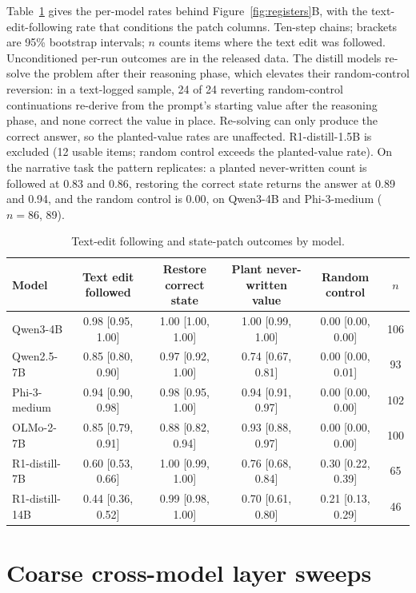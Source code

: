 \documentclass{article}
\begin{document}
Table~\ref{tab:mechanism} gives the per-model rates behind Figure~\ref{fig:registers}B, with the text-edit-following rate that conditions the patch columns. Ten-step chains; brackets are 95\% bootstrap intervals; $n$ counts items where the text edit was followed. Unconditioned per-run outcomes are in the released data. The distill models re-solve the problem after their reasoning phase, which elevates their random-control reversion: in a text-logged sample, 24 of 24 reverting random-control continuations re-derive from the prompt's starting value after the reasoning phase, and none correct the value in place. Re-solving can only produce the correct answer, so the planted-value rates are unaffected. R1-distill-1.5B is excluded (12 usable items; random control exceeds the planted-value rate). On the narrative task the pattern replicates: a planted never-written count is followed at 0.83 and 0.86, restoring the correct state returns the answer at 0.89 and 0.94, and the random control is 0.00, on Qwen3-4B and Phi-3-medium ($n=86$, 89).
\begin{table}[h]
\centering
\caption{Text-edit following and state-patch outcomes by model.}
\label{tab:mechanism}
\scriptsize
\begin{tabular}{lccccc}
\toprule
Model & Text edit followed & Restore correct state & Plant never-written value & Random control & $n$ \\
\midrule
Qwen3-4B & 0.98 [0.95, 1.00] & 1.00 [1.00, 1.00] & 1.00 [0.99, 1.00] & 0.00 [0.00, 0.00] & 106 \\
Qwen2.5-7B & 0.85 [0.80, 0.90] & 0.97 [0.92, 1.00] & 0.74 [0.67, 0.81] & 0.00 [0.00, 0.01] & 93 \\
Phi-3-medium & 0.94 [0.90, 0.98] & 0.98 [0.95, 1.00] & 0.94 [0.91, 0.97] & 0.00 [0.00, 0.00] & 102 \\
OLMo-2-7B & 0.85 [0.79, 0.91] & 0.88 [0.82, 0.94] & 0.93 [0.88, 0.97] & 0.00 [0.00, 0.00] & 100 \\
R1-distill-7B & 0.60 [0.53, 0.66] & 1.00 [0.99, 1.00] & 0.76 [0.68, 0.84] & 0.30 [0.22, 0.39] & 65 \\
R1-distill-14B & 0.44 [0.36, 0.52] & 0.99 [0.98, 1.00] & 0.70 [0.61, 0.80] & 0.21 [0.13, 0.29] & 46 \\
\bottomrule
\end{tabular}
\end{table}

\section{Coarse cross-model layer sweeps}
\label{app:sweeps}
\end{document}
